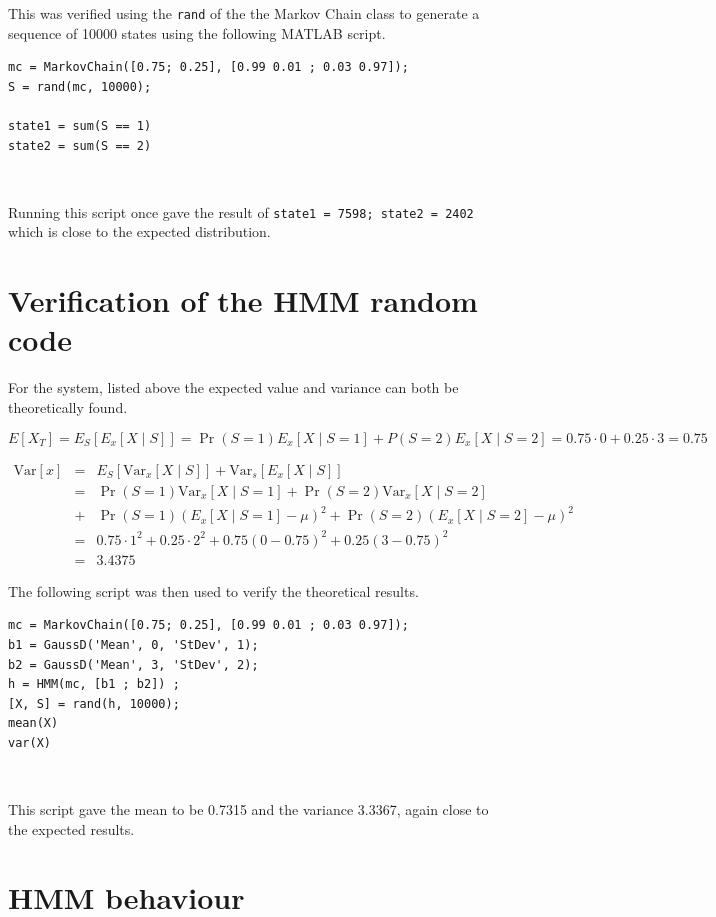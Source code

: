 \documentclass[11pt]{article}   %
\begin{document}
This was verified using the \texttt{rand} of the the Markov Chain class to generate a sequence of 10000 states using the following MATLAB script.

\begin{lstlisting}
mc = MarkovChain([0.75; 0.25], [0.99 0.01 ; 0.03 0.97]);
S = rand(mc, 10000);

state1 = sum(S == 1)
state2 = sum(S == 2)
\end{lstlisting}\

Running this script once gave the result of \texttt{state1 = 7598; state2 =  2402} which is close to the expected distribution.

\newpage

\section{Verification of the HMM random code}

For the system, listed above the expected value and variance can both be theoretically found.

$$ E[X_T] = E_S [E_x[X \mid S]] = \Pr(S = 1)  E_x[X \mid S = 1] + P(S = 2)E_x[X \mid S = 2] = 0.75 \cdot 0 + 0.25 \cdot 3 = 0.75$$ 

$$ \newcommand{\Var}{\mathrm{Var}} \begin{array} {lcl} \Var[x] & = & E_S [ \Var_x [ X \mid S]] + \Var_s [E_x [X \mid S] ] \\ 
& = & \Pr(S = 1) \Var_x [X \mid S = 1] + \Pr(S = 2) \Var_x[X \mid S = 2] \\
 & + & \Pr(S = 1) (E_x[X \mid S = 1] - \mu)^2 + \Pr(S = 2)(E_x[X \mid S = 2] - \mu)^2\\
 & = & 0.75 \cdot 1^2 + 0.25 \cdot 2^2 + 0.75(0 - 0.75)^2 + 0.25(3- 0.75)^2 \\
 & = & 3.4375 \end{array}$$

The following script was then used to verify the theoretical results.

\begin{lstlisting}
mc = MarkovChain([0.75; 0.25], [0.99 0.01 ; 0.03 0.97]);
b1 = GaussD('Mean', 0, 'StDev', 1);
b2 = GaussD('Mean', 3, 'StDev', 2);
h = HMM(mc, [b1 ; b2]) ;
[X, S] = rand(h, 10000);
mean(X)
var(X)
\end{lstlisting}\

This script gave the mean to be 0.7315 and the variance 3.3367, again close to the expected results.
\newpage

\section{HMM behaviour}
\end{document}
